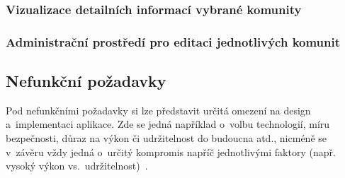 \hypertarget{vizualizace-detailnuxedch-informacuxed-vybranuxe9-komunity}{%
\subsubsection{Vizualizace detailních informací vybrané komunity}\label{vizualizace-detailnuxedch-informacuxed-vybranuxe9-komunity}}

\hypertarget{administraux10dnuxed-prostux159eduxed-pro-editaci-jednotlivuxfdch-komunit}{%
\subsubsection{Administrační prostředí pro editaci jednotlivých komunit}\label{administraux10dnuxed-prostux159eduxed-pro-editaci-jednotlivuxfdch-komunit}}

\hypertarget{nefunkux10dnuxed-poux17eadavky}{%
\subsection{Nefunkční požadavky}\label{nefunkux10dnuxed-poux17eadavky}}

Pod nefunkčními požadavky si lze představit určitá omezení na design a~implementaci aplikace. Zde se jedná například o~volbu technologií, míru bezpečnosti, důraz na výkon či udržitelnost do budoucna atd., nicméně se v~závěru vždy jedná o~určitý kompromis napříč jednotlivými faktory (např. vysoký výkon vs.~udržitelnost)~\parencite{Gorton2006}.

